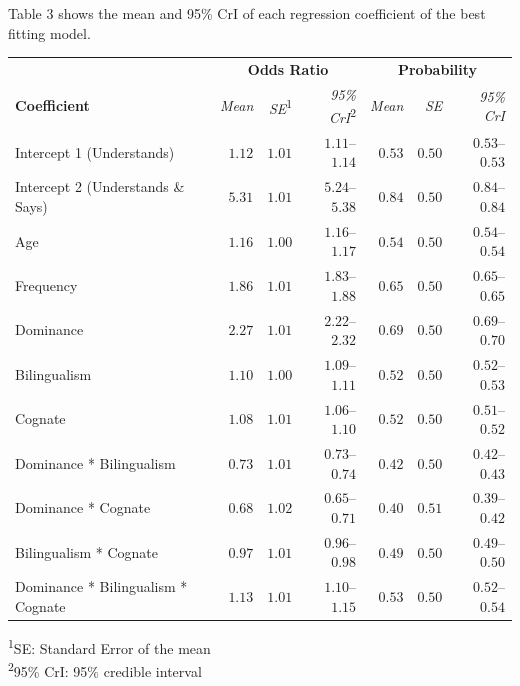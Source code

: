 \documentclass[
  english,
  man,man,floatsintext]{apa6}
\begin{document}
Table 3 shows the mean and 95\% CrI of each regression coefficient of the best fitting model.

\captionsetup[table]{labelformat=empty,skip=1pt}
\begin{longtable}{lrrrrrr}
\toprule
& \multicolumn{3}{c}{\textbf{Odds Ratio}} & \multicolumn{3}{c}{\textbf{Probability}} \\ 
 \cmidrule(lr){2-4}\cmidrule(lr){5-7}
\textbf{Coefficient} & \emph{Mean} & \emph{SE}\textsuperscript{1} & \emph{95\% CrI}\textsuperscript{2} & \emph{Mean} & \emph{SE} & \emph{95\% CrI} \\ 
\midrule
Intercept 1 (Understands) & $1.12$ & $1.01$ & $1.11$–$1.14$ & $0.53$ & $0.50$ & $0.53$–$0.53$ \\ 
Intercept 2 (Understands \& Says) & $5.31$ & $1.01$ & $5.24$–$5.38$ & $0.84$ & $0.50$ & $0.84$–$0.84$ \\ 
Age & $1.16$ & $1.00$ & $1.16$–$1.17$ & $0.54$ & $0.50$ & $0.54$–$0.54$ \\ 
Frequency & $1.86$ & $1.01$ & $1.83$–$1.88$ & $0.65$ & $0.50$ & $0.65$–$0.65$ \\ 
Dominance & $2.27$ & $1.01$ & $2.22$–$2.32$ & $0.69$ & $0.50$ & $0.69$–$0.70$ \\ 
Bilingualism & $1.10$ & $1.00$ & $1.09$–$1.11$ & $0.52$ & $0.50$ & $0.52$–$0.53$ \\ 
Cognate & $1.08$ & $1.01$ & $1.06$–$1.10$ & $0.52$ & $0.50$ & $0.51$–$0.52$ \\ 
Dominance * Bilingualism & $0.73$ & $1.01$ & $0.73$–$0.74$ & $0.42$ & $0.50$ & $0.42$–$0.43$ \\ 
Dominance * Cognate & $0.68$ & $1.02$ & $0.65$–$0.71$ & $0.40$ & $0.51$ & $0.39$–$0.42$ \\ 
Bilingualism * Cognate & $0.97$ & $1.01$ & $0.96$–$0.98$ & $0.49$ & $0.50$ & $0.49$–$0.50$ \\ 
Dominance * Bilingualism * Cognate & $1.13$ & $1.01$ & $1.10$–$1.15$ & $0.53$ & $0.50$ & $0.52$–$0.54$ \\ 
\bottomrule
\end{longtable}
\vspace{-5mm}
\begin{minipage}{\linewidth}
\textsuperscript{1}SE: Standard Error of the mean \\ 
\textsuperscript{2}95\% CrI: 95\% credible interval \\ 
\end{minipage}
\end{document}
